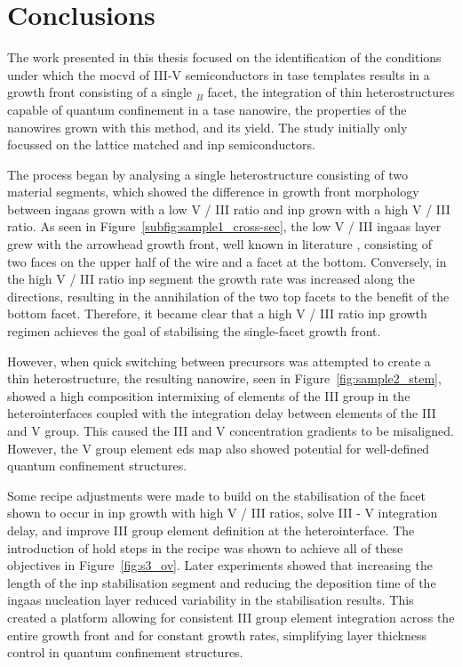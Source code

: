 \chapter{Conclusions}
\label{chap:conclusions}

The work presented in this thesis focused on the identification of the conditions under which the \acf{mocvd} of III-V semiconductors in \acf{tase} templates results in a growth front consisting of a single \(_B\) facet, the integration of thin heterostructures capable of quantum confinement in a \acs{tase} nanowire, the properties of the nanowires grown with this method, and its yield. The study initially only focussed on the lattice matched  and \acs{inp} semiconductors.

The process began by analysing a single heterostructure consisting of two material segments, which showed the difference in growth front morphology between \acf{ingaas} grown with a low V / III ratio and \acf{inp} grown with a high V / III ratio. As seen in Figure~\ref{subfig:sample1_cross-sec}, the low V / III \acs{ingaas} layer grew with the arrowhead growth front, well known in literature \cite{Knoedler2017}, consisting of two  faces on the upper half of the wire and a  facet at the bottom. Conversely, in the high V / III ratio \acs{inp} segment the growth rate was increased along the  directions, resulting in the annihilation of the two top  facets to the benefit of the bottom  facet. Therefore, it became clear that a high V / III ratio \acs{inp} growth regimen achieves the goal of stabilising the single-facet growth front.

However, when quick switching between precursors was attempted to create a thin heterostructure, the resulting nanowire, seen in Figure~\ref{fig:sample2_stem}, showed a high composition intermixing of elements of the III group in the heterointerfaces coupled with the integration delay between elements of the III and V group. This caused the III and V concentration gradients to be misaligned. However, the V group element \acf{eds} map also showed potential for well-defined quantum confinement structures.

Some recipe adjustments were made to build on the stabilisation of the  facet shown to occur in \acs{inp} growth with high V / III ratios, solve III - V integration delay, and improve III group element definition at the heterointerface. The introduction of hold steps in the recipe was shown to achieve all of these objectives in Figure~\ref{fig:s3_ov}. Later experiments showed that increasing the length of the \acs{inp} stabilisation segment and reducing the deposition time of the \acs{ingaas} nucleation layer reduced variability in the stabilisation results. This created a platform allowing for consistent III group element integration across the entire growth front and for constant growth rates, simplifying layer thickness control in quantum confinement structures.

